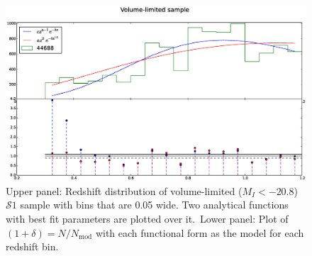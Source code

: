 \documentclass[twocolumn,useAMS,usenatbib]{mn2e}
\newcommand{\s}{\ensuremath{\mathcal{S}}}
\begin{document}
\begin{figure}
 \centering
  \includegraphics[width=\columnwidth]{redshift_vollimited}
  \caption{Upper panel: Redshift distribution of volume-limited ($M_I <  -20.8$) \s$1$ sample with bins that are 0.05 wide. Two analytical functions with best fit parameters are plotted over it.\
           Lower panel: Plot of $(1+\delta) = N/N_{\text{mod}}$ with each functional form as the model for each redshift bin.}
  \label{fig:redshift_vollimited}
\end{figure}

  
\end{document}
